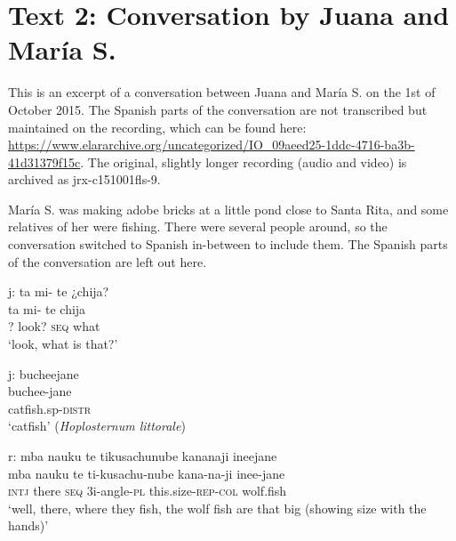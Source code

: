 

\section{Text 2: Conversation by Juana and María S.}

This is an excerpt of a conversation between Juana and María S. on the 1st of October 2015.  The Spanish parts of the conversation are not transcribed but maintained on the recording, which can be found here:
\url{https://www.elararchive.org/uncategorized/IO_09aeed25-1ddc-4716-ba3b-41d31379f15c}.
The original, slightly longer recording (audio and video) is archived as jrx-c151001fls-9.

María S. was making adobe bricks at a little pond close to Santa Rita, and some relatives of her were fishing. There were several people around, so the conversation switched to Spanish in-between to include them. The Spanish parts of the conversation are left out here.


\ea%
\begingl 
\glpreamble \textup{j:} ta mi- te ¿chija?\\
\gla ta mi- te chija\\ 
\glb ? look? \textsc{seq} what\\ 
\glft ‘look, what is that?’\\ 
\endgl
\xe

\ea%
\begingl 
\glpreamble \textup{j:} bucheejane\\
\gla buchee-jane\\ 
\glb catfish.sp-\textsc{distr}\\ 
\glft ‘catfish’ (\textit{Hoplosternum littorale})\\ 
\endgl
\xe

\ea%
\begingl 
\glpreamble \textup{r:} mba nauku te tikusachunube kananaji ineejane\\
\gla mba nauku te ti-kusachu-nube kana-na-ji inee-jane\\ 
\glb \textsc{intj} there \textsc{seq} 3i-angle-\textsc{pl} this.size-\textsc{rep}-\textsc{col} wolf.fish\\ 
\glft ‘well, there, where they fish, the wolf fish are that big (showing size with the hands)’\\ 
\endgl
\xe


